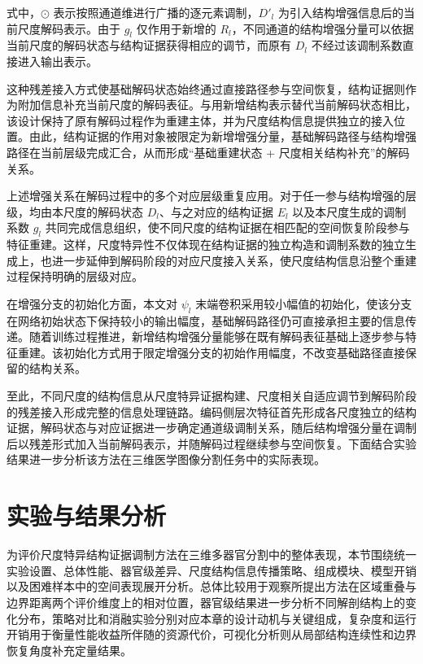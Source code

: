 式中，\(\odot\) 表示按照通道维进行广播的逐元素调制，\(D'_l\) 为引入结构增强信息后的当前尺度解码表示。由于 \(g_l\) 仅作用于新增的 \(R_l\)，不同通道的结构增强分量可以依据当前尺度的解码状态与结构证据获得相应的调节，而原有 \(D_l\) 不经过该调制系数直接进入输出表示。

这种残差接入方式使基础解码状态始终通过直接路径参与空间恢复，结构证据则作为附加信息补充当前尺度的解码表征。与用新增结构表示替代当前解码状态相比，该设计保持了原有解码过程作为重建主体，并为尺度结构信息提供独立的接入位置。由此，结构证据的作用对象被限定为新增增强分量，基础解码路径与结构增强路径在当前层级完成汇合，从而形成“基础重建状态 + 尺度相关结构补充”的解码关系。

上述增强关系在解码过程中的多个对应层级重复应用。对于任一参与结构增强的层级，均由本尺度的解码状态 \(D_l\)、与之对应的结构证据 \(E_l\) 以及本尺度生成的调制系数 \(g_l\) 共同完成信息组织，使不同尺度的结构证据在相匹配的空间恢复阶段参与特征重建。这样，尺度特异性不仅体现在结构证据的独立构造和调制系数的独立生成上，也进一步延伸到解码阶段的对应尺度接入关系，使尺度结构信息沿整个重建过程保持明确的层级对应。

在增强分支的初始化方面，本文对 \(\psi_l\) 末端卷积采用较小幅值的初始化，使该分支在网络初始状态下保持较小的输出幅度，基础解码路径仍可直接承担主要的信息传递。随着训练过程推进，新增结构增强分量能够在既有解码表征基础上逐步参与特征重建。该初始化方式用于限定增强分支的初始作用幅度，不改变基础路径直接保留的结构关系。

至此，不同尺度的结构信息从尺度特异证据构建、尺度相关自适应调节到解码阶段的残差接入形成完整的信息处理链路。编码侧层次特征首先形成各尺度独立的结构证据，解码状态与对应证据进一步确定通道级调制关系，随后结构增强分量在调制后以残差形式加入当前解码表示，并随解码过程继续参与空间恢复。下面结合实验结果进一步分析该方法在三维医学图像分割任务中的实际表现。

\section{实验与结果分析}

为评价尺度特异结构证据调制方法在三维多器官分割中的整体表现，本节围绕统一实验设置、总体性能、器官级差异、尺度结构信息传播策略、组成模块、模型开销以及困难样本中的空间表现展开分析。总体比较用于观察所提出方法在区域重叠与边界距离两个评价维度上的相对位置，器官级结果进一步分析不同解剖结构上的变化分布，策略对比和消融实验分别对应本章的设计动机与关键组成，复杂度和运行开销用于衡量性能收益所伴随的资源代价，可视化分析则从局部结构连续性和边界恢复角度补充定量结果。

